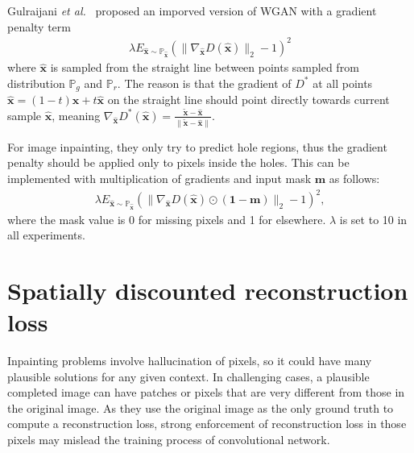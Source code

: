 \documentclass[10pt,twocolumn,letterpaper]{article}
\begin{document}
Gulraijani \emph{et al.}~\cite{13} proposed an imporved version of WGAN with a gradient penalty term\\
\begin{gather}
\lambda E_{\hat{\mathbf{x}}\sim\mathbb{P}_{\hat{\mathbf{x}}}}(\|\nabla_{\hat{\mathbf{x}}}D(\hat{\mathbf{x}})\|_2 - 1)^2
\end{gather}
where $\hat{\mathbf{x}}$ is sampled from the straight line between points sampled from distribution $\mathbb{P}_g$ and $\mathbb{P}_r$. The reason is that the gradient of $D^\ast$ at all points $\hat{\mathbf{x}} = (1 - t)\mathbf{x} + t\hat{\mathbf{x}}$ on the straight line should point directly towards current sample $\hat{\mathbf{x}}$, meaning $\nabla_{\hat{\mathbf{x}}}D^{\ast}(\hat{\mathbf{x}}) = \frac{\tilde{\mathbf{x}} - \hat{\mathbf{x}}}{\|\tilde{\mathbf{x}} - \hat{\mathbf{x}}\|}$.

For image inpainting, they only try to predict hole regions, thus the gradient penalty should be applied only to pixels inside the holes. This can be implemented with multiplication of gradients and input mask $\mathbf{m}$ as follows:
\begin{gather}
\lambda E_{\hat{\mathbf{x}}\sim\mathbb{P}_{\hat{\mathbf{x}}}}(\|\nabla_{\hat{\mathbf{x}}}D(\hat{\mathbf{x}}) \odot (\mathbf{1} - \mathbf{m})\|_2 - 1)^2,
\end{gather}
where the mask value is 0 for missing pixels and 1 for elsewhere. $\lambda$ is set to 10 in all experiments.

\section{Spatially discounted reconstruction loss}

Inpainting problems involve hallucination of pixels, so it could have many plausible solutions for any given context. In challenging cases, a plausible completed image can have patches or pixels that are very different from those in the original image. As they use the original image as the only ground truth to compute a reconstruction loss, strong enforcement of reconstruction loss in those pixels may mislead the training process of convolutional network.




{\small


}
\end{document}
